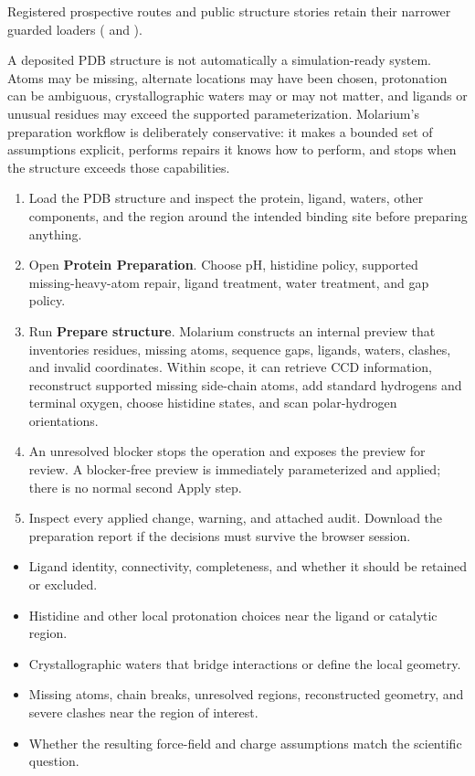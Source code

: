 \documentclass[11pt]{article}
\begin{document}
Registered prospective routes and public structure stories retain their narrower guarded loaders ( and ).


A deposited PDB structure is not automatically a simulation-ready system. Atoms may be missing, alternate locations may have been chosen, protonation can be ambiguous, crystallographic waters may or may not matter, and ligands or unusual residues may exceed the supported parameterization. Molarium's preparation workflow is deliberately conservative: it makes a bounded set of assumptions explicit, performs repairs it knows how to perform, and stops when the structure exceeds those capabilities.


\begin{enumerate}
\item Load the PDB structure and inspect the protein, ligand, waters, other components, and the region around the intended binding site before preparing anything.
\item Open \textbf{Protein Preparation}. Choose pH, histidine policy, supported missing-heavy-atom repair, ligand treatment, water treatment, and gap policy.
\item Run \textbf{Prepare structure}. Molarium constructs an internal preview that inventories residues, missing atoms, sequence gaps, ligands, waters, clashes, and invalid coordinates. Within scope, it can retrieve CCD information, reconstruct supported missing side-chain atoms, add standard hydrogens and terminal oxygen, choose histidine states, and scan polar-hydrogen orientations.
\item An unresolved blocker stops the operation and exposes the preview for review. A blocker-free preview is immediately parameterized and applied; there is no normal second Apply step.
\item Inspect every applied change, warning, and attached audit. Download the preparation report if the decisions must survive the browser session.
\end{enumerate}


\begin{itemize}
\item Ligand identity, connectivity, completeness, and whether it should be retained or excluded.
\item Histidine and other local protonation choices near the ligand or catalytic region.
\item Crystallographic waters that bridge interactions or define the local geometry.
\item Missing atoms, chain breaks, unresolved regions, reconstructed geometry, and severe clashes near the region of interest.
\item Whether the resulting force-field and charge assumptions match the scientific question.
\end{itemize}
\end{document}
